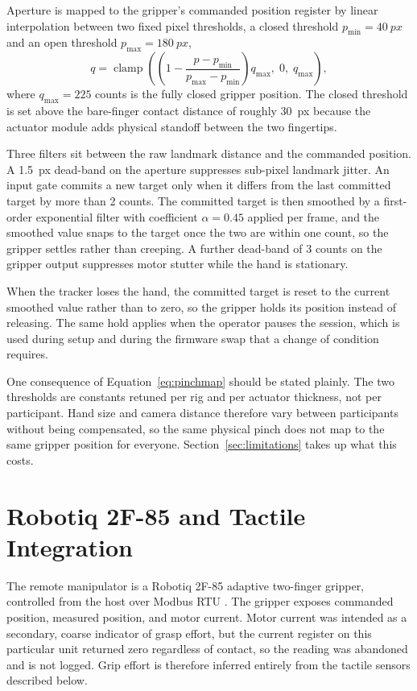 \documentclass[12pt, a4paper, twoside, openright]{report}
\begin{document}
Aperture is mapped to the gripper's commanded position register by linear
interpolation between two fixed pixel thresholds, a closed threshold
$p_{\text{min}} = \SI{40}{px}$ and an open threshold
$p_{\text{max}} = \SI{180}{px}$,
\begin{equation}
    q = \operatorname{clamp}\!\left(
    \left(1 - \frac{p - p_{\text{min}}}{p_{\text{max}} - p_{\text{min}}}\right)
    q_{\text{max}},\; 0,\; q_{\text{max}}\right),
    \label{eq:pinchmap}
\end{equation}
where $q_{\text{max}} = 225$ counts is the fully closed gripper position. The
closed threshold is set above the bare-finger contact distance of roughly
\SI{30}{px} because the actuator module adds physical standoff between the two
fingertips.

Three filters sit between the raw landmark distance and the commanded position.
A \SI{1.5}{px} dead-band on the aperture suppresses sub-pixel landmark jitter.
An input gate commits a new target only when it differs from the last committed
target by more than 2 counts. The committed target is then smoothed by a
first-order exponential filter with coefficient $\alpha = 0.45$ applied per
frame, and the smoothed value snaps to the target once the two are within one
count, so the gripper settles rather than creeping. A further dead-band of 3
counts on the gripper output suppresses motor stutter while the hand is
stationary.

When the tracker loses the hand, the committed target is reset to the current
smoothed value rather than to zero, so the gripper holds its position instead
of releasing. The same hold applies when the operator pauses the session, which
is used during setup and during the firmware swap that a change of condition
requires.

One consequence of Equation~\eqref{eq:pinchmap} should be stated plainly. The
two thresholds are constants retuned per rig and per actuator thickness, not
per participant. Hand size and camera distance therefore vary between
participants without being compensated, so the same physical pinch does not map
to the same gripper position for everyone. Section~\ref{sec:limitations} takes
up what this costs.

\section{Robotiq 2F-85 and Tactile Integration}
\label{sec:gripper}

The remote manipulator is a Robotiq 2F-85 adaptive two-finger gripper,
controlled from the host over Modbus RTU \cite{robotiq_manual}. The gripper
exposes commanded position, measured position, and motor current. Motor current
was intended as a secondary, coarse indicator of grasp effort, but the current
register on this particular unit returned zero regardless of contact, so the
reading was abandoned and is not logged. Grip effort is therefore inferred
entirely from the tactile sensors described below.
\end{document}
